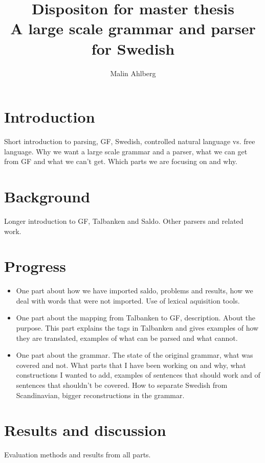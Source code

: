 \documentclass{article}
\begin{document}
\title{Dispositon for master thesis \\
             \small{A large scale grammar and parser for Swedish}}
\author{Malin Ahlberg}
\maketitle

\section{Introduction} 
Short introduction to parsing, GF, Swedish, controlled natural language vs.
free language.
Why we want a large scale grammar and a parser, what we can get from GF and
what we can't get. Which parts we are focusing on and why.

\section{Background}  
Longer introduction to GF, Talbanken and Saldo. Other parsers and related work.

\section{Progress}  
\begin{itemize}
\item{
One part about how we have imported saldo, problems and results, how we deal
with words that were not imported. Use of lexical aquisition tools. 
}
\item{
One part about the mapping from Talbanken to GF, description. About the purpose.
This part explains
the tags in Talbanken and gives examples of how they are translated,
examples of what can be parsed and what cannot.
}
\item{
One part about the grammar. The state of the original grammar, what was covered and not. 
What parts that I have been working on and why, 
what constructions I wanted to add, examples of sentences that should work
and of sentences that shouldn't be covered. How to separate Swedish from
Scandinavian, bigger reconstructions in the grammar. 
}
\end{itemize}

\section{Results and discussion}
Evaluation methods and results from all parts. 
\end{document}
